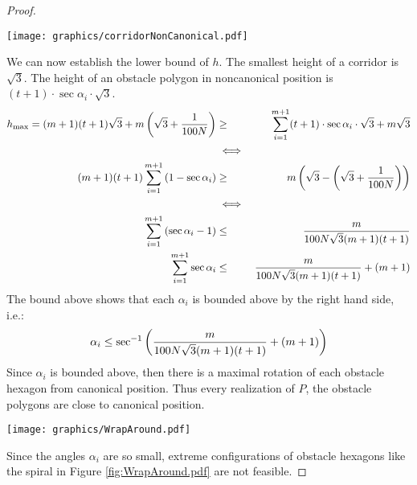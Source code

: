 \begin{proof}
\begin{minipage}{\linewidth}
\begin{center}
\texttt{[image: graphics/corridorNonCanonical.pdf]}
\label{fig:corridorNonCanonical.pdf}
\end{center}
\end{minipage}

We can now establish the lower bound of $h$. 
The smallest height of a corridor is $\sqrt{3}$.
The height of an obstacle polygon in noncanonical position is $(t+1) \cdot \sec \alpha_i \cdot \sqrt{3}$.  
\begin{eqnarray*}
h_\text{max} = (m+1) (t+1) \sqrt{3} + m \left( \sqrt{3}+ \frac{1}{100N} \right)&\geq& \sum_{i = 1}^{m+1} (t+1) \cdot \sec \alpha_i \cdot \sqrt{3} + m \sqrt{3}\\
&\iff&\\
(m+1) (t+1) \sum_{i = 1}^{m+1} \left( 1 - \sec \alpha_i \right)&\geq& m \left( \sqrt{3} - \left( \sqrt{3}+ \frac{1}{100N} \right) \right)\\
&\iff&\\
\sum_{i = 1}^{m+1} \left(  \sec \alpha_i - 1 \right) &\leq& \frac{m}{100 N \sqrt{3} (m+1)(t+1) }\\
\sum_{i = 1}^{m+1}  \sec \alpha_i &\leq& \frac{m}{100 N \sqrt{3} (m+1)(t+1) } + (m+1)
\end{eqnarray*}
The bound above shows that each $\alpha_i$ is bounded above by the right hand side, i.e.:
\begin{equation}\label{eqn:alphaBound}
\alpha_i \leq \sec^{-1} \left( \frac{m}{100 N \sqrt{3} (m+1)(t+1) } + (m+1) \right)
\end{equation}
Since $\alpha_i$ is bounded above, then there is a maximal rotation of each obstacle hexagon from canonical position.
Thus every realization of $P$, the obstacle polygons are close to canonical position.

\begin{minipage}{\linewidth}
\begin{center}
\texttt{[image: graphics/WrapAround.pdf]}
\label{fig:WrapAround.pdf}
\end{center}
\end{minipage}

Since the angles $\alpha_i$ are so small, extreme configurations of obstacle hexagons like the spiral in Figure \ref{fig:WrapAround.pdf} are not feasible.
\end{proof}

